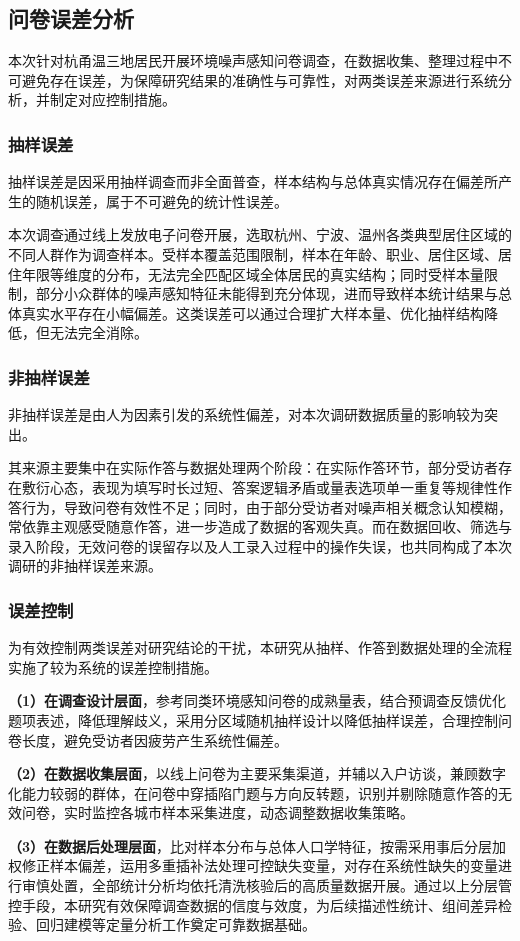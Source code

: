 \subsection{问卷误差分析}

本次针对杭甬温三地居民开展环境噪声感知问卷调查，在数据收集、整理过程中不可避免存在误差，为保障研究结果的准确性与可靠性，对两类误差来源进行系统分析，并制定对应控制措施。

\subsubsection{抽样误差}

抽样误差是因采用抽样调查而非全面普查，样本结构与总体真实情况存在偏差所产生的随机误差，属于不可避免的统计性误差。

本次调查通过线上发放电子问卷开展，选取杭州、宁波、温州各类典型居住区域的不同人群作为调查样本。受样本覆盖范围限制，样本在年龄、职业、居住区域、居住年限等维度的分布，无法完全匹配区域全体居民的真实结构；同时受样本量限制，部分小众群体的噪声感知特征未能得到充分体现，进而导致样本统计结果与总体真实水平存在小幅偏差。这类误差可以通过合理扩大样本量、优化抽样结构降低，但无法完全消除。

\subsubsection{非抽样误差}

非抽样误差是由人为因素引发的系统性偏差，对本次调研数据质量的影响较为突出。

其来源主要集中在实际作答与数据处理两个阶段：在实际作答环节，部分受访者存在敷衍心态，表现为填写时长过短、答案逻辑矛盾或量表选项单一重复等规律性作答行为，导致问卷有效性不足；同时，由于部分受访者对噪声相关概念认知模糊，常依靠主观感受随意作答，进一步造成了数据的客观失真。而在数据回收、筛选与录入阶段，无效问卷的误留存以及人工录入过程中的操作失误，也共同构成了本次调研的非抽样误差来源。

\subsubsection{误差控制}

为有效控制两类误差对研究结论的干扰，本研究从抽样、作答到数据处理的全流程实施了较为系统的误差控制措施。

\textbf{（1）在调查设计层面}，参考同类环境感知问卷的成熟量表，结合预调查反馈优化题项表述，降低理解歧义，采用分区域随机抽样设计以降低抽样误差，合理控制问卷长度，避免受访者因疲劳产生系统性偏差。

\textbf{（2）在数据收集层面}，以线上问卷为主要采集渠道，并辅以入户访谈，兼顾数字化能力较弱的群体，在问卷中穿插陷门题与方向反转题，识别并剔除随意作答的无效问卷，实时监控各城市样本采集进度，动态调整数据收集策略。

\textbf{（3）在数据后处理层面}，比对样本分布与总体人口学特征，按需采用事后分层加权修正样本偏差，运用多重插补法处理可控缺失变量，对存在系统性缺失的变量进行审慎处置，全部统计分析均依托清洗核验后的高质量数据开展。通过以上分层管控手段，本研究有效保障调查数据的信度与效度，为后续描述性统计、组间差异检验、回归建模等定量分析工作奠定可靠数据基础。


